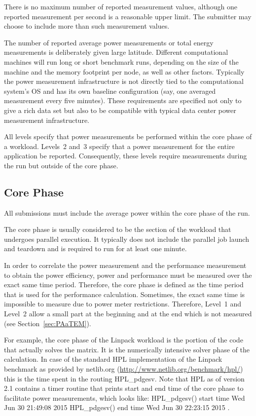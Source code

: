 There is no maximum number of reported measurement values, although one reported measurement per second is a reasonable upper limit.
The submitter may choose to include more than \MinMeasurementsCorePhaseLTwoThree{} such measurement values.

The number of reported average power measurements or total energy measurements is deliberately given large latitude.
Different computational machines will run long or short benchmark runs, depending on the size of the machine and the memory footprint per node, as well as other factors.
Typically the power measurement infrastructure is not directly tied to the computational system's OS and has its own baseline configuration (say, one averaged measurement every five minutes).
These requirements are specified not only to give a rich data set but also to be compatible with typical data center power measurement infrastructure.

All levels specify that power measurements be performed within the core phase of a workload.
Levels~2 and~3 specify that a power measurement for the entire application be reported.
Consequently, these levels require measurements during the run but outside of the core phase.

\subsection{Core Phase}
\label{sec:core_phase}

All submissions must include the average power within the core phase of the run.

The core phase is usually considered to be the section of the workload that undergoes parallel execution.
It typically does not include the parallel job launch and teardown and is required to run for at least one minute.

In order to correlate the power measurement and the performance measurement to obtain the power efficiency, power and performance must be measured over the exact same time period.
Therefore, the core phase is defined as the time period that is used for the performance calculation.
Sometimes, the exact same time is impossible to measure due to power meter restrictions.
Therefore, Level~1 and Level~2 allow a small part at the beginning and at the end which is not measured (see Section~\ref{sec:PAaTEM}).

For example, the core phase of the Linpack workload is the portion of the code that actually solves the matrix.
It is the numerically intensive solver phase of the calculation.
In case of the standard HPL implementation of the Linpack benchmark as provided by netlib.org (\url{http://www.netlib.org/benchmark/hpl/}) this is the time spent in the routing {\ttfamily HPL\_pdgesv}.
Note that HPL as of version 2.1 contains a timer routine that prints start and end time of the core phase to facilitate power measurements, which looks like:\newline
{\ttfamily
HPL\_pdgesv() start time Wed Jun 30 21:49:08 2015\newline
HPL\_pdgesv() end time Wed Jun 30 22:23:15 2015
}.

